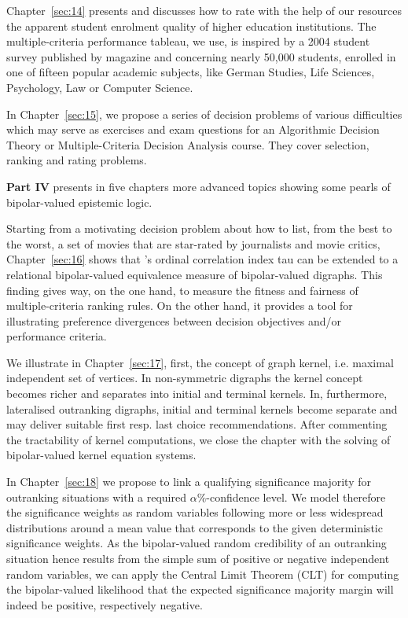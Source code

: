 Chapter~\ref{sec:14} presents and discusses how to rate with the help of our \Digraph resources the apparent student enrolment quality of higher education institutions. The multiple-criteria performance tableau, we use, is inspired by a 2004 student survey published by \Spiegel magazine and concerning nearly 50,000 students, enrolled in one of fifteen popular academic subjects, like German Studies, Life Sciences, Psychology, Law or Computer Science.

In Chapter~\ref{sec:15}, we propose a series of decision problems of various difficulties which may serve as exercises and exam questions for an Algorithmic Decision Theory or Multiple-Criteria Decision Analysis course. They cover selection, ranking and rating problems.
\vspace{5pt}

\textbf{Part IV} presents in five chapters more advanced topics showing some pearls of bipolar-valued epistemic logic.

Starting from a motivating decision problem about how to list, from the best to the worst, a set of movies that are star-rated by journalists and movie critics, Chapter~\ref{sec:16} shows that \Kendall’s ordinal correlation index tau can be extended to a relational bipolar-valued equivalence measure of bipolar-valued digraphs. This finding gives way, on the one hand, to measure the fitness and fairness of multiple-criteria ranking rules. On the other hand, it provides a tool for illustrating preference divergences between decision objectives and/or performance criteria.

We illustrate in Chapter~\ref{sec:17}, first, the concept of graph kernel, i.e. maximal independent set of vertices. In non-symmetric digraphs the kernel concept becomes richer and separates into initial and terminal kernels. In, furthermore, lateralised outranking digraphs, initial and terminal kernels become separate and may deliver suitable first resp. last choice recommendations. After commenting the tractability of kernel computations, we close the chapter with the solving of bipolar-valued kernel equation systems.

In Chapter~\ref{sec:18} we propose to link a qualifying significance majority for outranking situations with a required $\alpha\%$-confidence level. We model therefore the significance weights as random variables following more or less widespread distributions around a mean value that corresponds to the given deterministic significance weights. As the bipolar-valued random credibility of an outranking situation hence results from the simple sum of positive or negative independent random variables, we can apply the Central Limit Theorem (CLT) for computing the bipolar-valued likelihood that the expected significance majority margin will indeed be positive, respectively negative.


